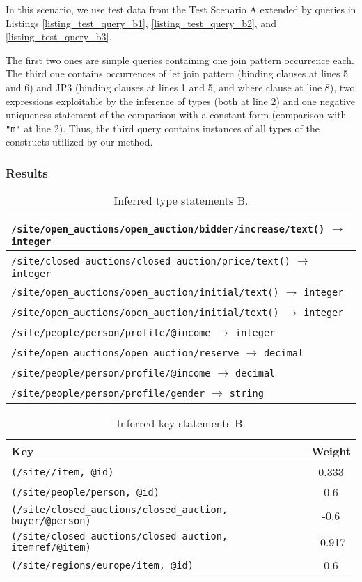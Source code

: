 In this scenario, we use test data from the Test Scenario A extended by queries in Listings \ref{listing_test_query_b1}, \ref{listing_test_query_b2}, and \ref{listing_test_query_b3}.

The first two ones are simple queries containing one join pattern occurrence each. The third one contains occurrences of let join pattern (binding clauses at lines 5 and 6) and JP3 (binding clauses at lines 1 and 5, and where clause at line 8), two expressions exploitable by the inference of types (both at line 2) and one negative uniqueness statement of the comparison-with-a-constant form (comparison with \texttt{"m"} at line 2). Thus, the third query contains instances of all types of the constructs utilized by our method.

\subsubsection{Results}

\begin{table}
\begin{tabular}{|l|}
\hline
\texttt{/site/open\_auctions/open\_auction/bidder/increase/text()} $\rightarrow$ \texttt{integer} \\ \hline
\texttt{/site/closed\_auctions/closed\_auction/price/text()} $\rightarrow$ \texttt{integer} \\ \hline
\texttt{/site/open\_auctions/open\_auction/initial/text()} $\rightarrow$ \texttt{integer} \\ \hline
\texttt{/site/open\_auctions/open\_auction/initial/text()} $\rightarrow$ \texttt{integer} \\ \hline
\texttt{/site/people/person/profile/@income} $\rightarrow$ \texttt{integer} \\ \hline
\texttt{/site/open\_auctions/open\_auction/reserve} $\rightarrow$ \texttt{decimal} \\ \hline
\texttt{/site/people/person/profile/@income} $\rightarrow$ \texttt{decimal} \\ \hline
\texttt{/site/people/person/profile/gender} $\rightarrow$ \texttt{string} \\ \hline
\end{tabular}
\caption{Inferred type statements B.}
\label{TAB_inferred_types_b}
\end{table}

\begin{table}
\begin{tabular}{|l|c|}
\hline
\textbf{Key} & \textbf{Weight} \\ \hline \hline
\texttt{(/site//item, {@id})} & 0.333 \\ \hline
\texttt{(/site/people/person, {@id})} & 0.6 \\ \hline
\texttt{(/site/closed\_auctions/closed\_auction, {buyer/@person})} & -0.6 \\ \hline
\texttt{(/site/closed\_auctions/closed\_auction, {itemref/@item})} & -0.917 \\ \hline
\texttt{(/site/regions/europe/item, {@id})} & 0.6 \\ \hline
\end{tabular}
\caption{Inferred key statements B.}
\label{TAB_inferred_keys_b}
\end{table}

